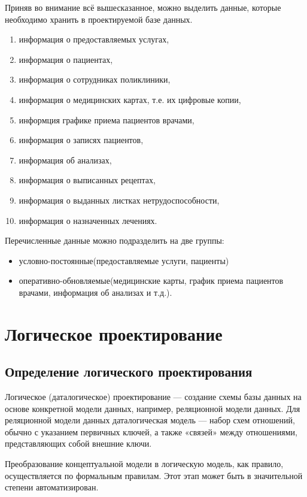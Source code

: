 \documentclass[14pt,a4paper,russian]{extreport}
\begin{document}
Приняв во внимание всё вышесказанное, можно выделить данные, которые необходимо хранить в проектируемой базе данных.
\begin{enumerate}[noitemsep]
    \item информация о предоставляемых услугах,
    \item информация о пациентах,
    \item информация о сотрудниках поликлиники,
    \item информация о медицинских картах, т.е. их цифровые копии,
    \item информция графике приема пациентов врачами,
    \item информация о записях пациентов,
    \item информация об анализах,
    \item информация о выписанных рецептах,
    \item информация о выданных листках нетрудоспособности,
    \item информация о назначенных лечениях.
\end{enumerate}

Перечисленные данные можно подразделить на две группы:
\begin{itemize}[noitemsep]
    \item условно-постоянные(предоставляемые услуги, пациенты)
    \item оперативно-обновляемые(медицинские карты, график приема пациентов врачами, информация об
        анализах и т.д.).
\end{itemize}


\chapter{Логическое проектирование}
\section{Определение логического проектирования}
Логическое (даталогическое) проектирование — создание схемы базы данных на основе конкретной модели
данных, например, реляционной модели данных. Для реляционной модели данных даталогическая модель —
набор схем отношений, обычно с указанием первичных ключей, а также «связей» между
отношениями, представляющих собой внешние ключи.

Преобразование концептуальной модели в логическую модель, как правило, осуществляется по
формальным правилам. Этот этап может быть в значительной степени автоматизирован.
\end{document}
